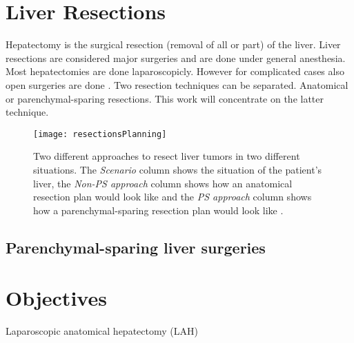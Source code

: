 \section{Liver Resections} 
Hepatectomy is the surgical resection (removal of all or part) of the liver.
Liver resections are considered major surgeries and are done under general
anesthesia. Most hepatectomies are done laparoscopicly. However for complicated
cases also open surgeries are done \cite{cherqui2000laparoscopic}. Two
resection techniques can be separated. Anatomical or parenchymal-sparing
resections. This work will concentrate on the latter technique.
\begin{figure}[H]
  \centering
 \texttt{[image: resectionsPlanning]}
  \caption{Two different approaches to resect liver tumors in two different
    situations. The \textit{Scenario} column shows the situation of the
    patient's liver, the \textit{Non-PS approach} column shows how an anatomical
  resection plan would look like and the \textit{PS approach} column shows how a
parenchymal-sparing resection plan would look like \cite{alvarez2016parenchymal}.}
  \label{fig:resectionsPlanning}
\end{figure}

\subsection{Parenchymal-sparing liver surgeries}
\cite{alvarez2016parenchymal}
\section{Objectives} 
Laparoscopic anatomical hepatectomy (LAH)

\endinput
